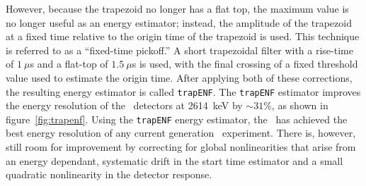 \documentclass[/main.tex]{subfiles}
\begin{document}
However, because the trapezoid no longer has a flat top, the maximum value is no longer useful as an energy estimator; instead, the amplitude of the trapezoid at a fixed time relative to the origin time of the trapezoid is used.
This technique is referred to as a ``fixed-time pickoff.''
A short trapezoidal filter with a rise-time of $1~\mu$s and a flat-top of $1.5~\mu$s is used, with the final crossing of a fixed threshold value used to estimate the origin time.
After applying both of these corrections, the resulting energy estimator is called \texttt{trapENF}.
The \texttt{trapENF} estimator improves the energy resolution of the \MJD\ detectors at 2614~keV by $\sim31\%$, as shown in figure~\ref{fig:trapenf}.
Using the \texttt{trapENF} energy estimator, the \MJD\ has achieved the best energy resolution of any current generation \znbb\ experiment.
There is, however, still room for improvement by correcting for global nonlinearities that arise from an energy dependant, systematic drift in the start time estimator and a small quadratic nonlinearity in the detector response.
\\
\end{document}

